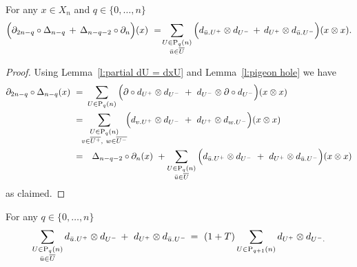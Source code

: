 \begin{lemma} \label{l:boundary of Delta}
	For any $x \in X_n$ and $q \in \{0, \dots, n\}$
	\begin{equation} \label{e:boundary of Delta}
	\Big( \partial_{2n-q} \circ \Delta_{n - q} \, +\, \Delta_{n-q-2} \circ \partial_n \Big) (x) \ = \! 
	\sum_{\substack{U \in \mathrm{P}_{q}(n) \\ {\bar{u}} \in \overline{U}}} \Big( d_{{\bar{u}}.U^+} \otimes d_{U^-} \, + \, d_{U^+} \otimes d_{{\bar{u}}.U^-} \Big) (x \otimes x).
	\end{equation}
\end{lemma}

\begin{proof}
	Using Lemma~\ref{l:partial dU = dxU} and Lemma~\ref{l:pigeon hole} we have
	\begin{equation*}
	\begin{split}
	\partial_{2n-q} \circ \Delta_{n - q} (x) \ = & \
	\sum_{U \in \P_q(n)} \Big( \partial \circ d_{U^+} \otimes d_{U^-}\ +\ d_{U^-} \otimes \partial \circ d_{U^-} \Big) (x \otimes x) \\ = & \!\!
	\sum_{\substack{U \in \P_q(n) \\ v \in \overline{U^+},\ w \in \overline{U^-} } }\!\! \Big( d_{v.U^+} \otimes d_{U^-}\ +\ d_{U^+} \otimes d_{w.U^-}\Big) (x \otimes x) \\ = &
	\quad \Delta_{n-q-2} \circ \partial_n (x) \ + 
	\sum_{\substack{U\in\P_{q}(n) \\ \bu \in \overline{U}}} \Big( d_{\bu.U^+} \otimes d_{U^-}\ +\ d_{U^+} \otimes d_{\bu.U^-}\Big) (x \otimes x)
	\end{split}
	\end{equation*}
	as claimed.
\end{proof}

\begin{lemma} \label{l:big lemma}  
	For any $q \in \{0, \dots, n\}$
	\begin{equation} \label{e:big lemma}
	\sum_{\substack{U \in \mathrm{P}_{q}(n) \\ {\bar{u}} \in \overline{U}}} d_{{\bar{u}}.U^+} \otimes d_{U^-}\, +\ d_{U^+} \otimes d_{{\bar{u}}.U^-}\, = \
	(1+T) \sum_{U \in \mathrm{P}_{q+1}(n)} d_{U^+} \otimes d_{U^-.}
	\end{equation}
\end{lemma}

